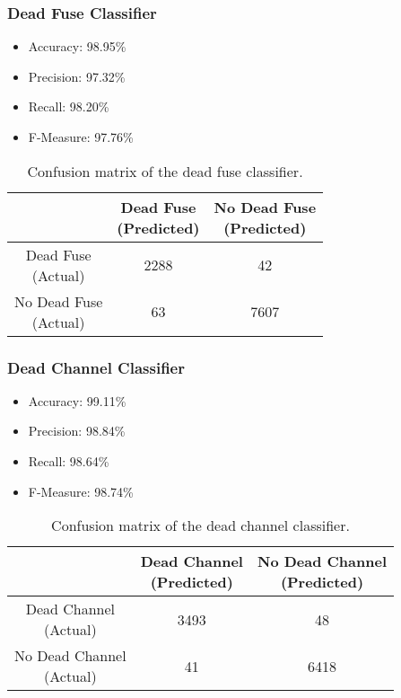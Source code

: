 \begin{frame}
  \frametitle{Dead Fuse Classifier}
  \begin{itemize}
  \item Accuracy: 98.95\%
  \item Precision: 97.32\%
  \item Recall: 98.20\%
  \item F-Measure: 97.76\%
\end{itemize}
\begin{table}[h]
  \centering
  \renewcommand\theadfont{\bfseries}
  \begin{tabular}{|c|c|c|}
    \hline
    & \thead{Dead Fuse\\(Predicted)} & \thead{No Dead Fuse\\(Predicted)} \\
    \hline
    \thead{Dead Fuse\\(Actual)} & 2288 & 42\\
    \hline
    \thead{No Dead Fuse\\(Actual)} & 63 & 7607\\
    \hline
  \end{tabular}
  \caption{Confusion matrix of the dead fuse classifier.}
\end{table}
\end{frame}

\begin{frame}
  \frametitle{Dead Channel Classifier}
  \begin{itemize}
  \item Accuracy: 99.11\%
  \item Precision: 98.84\%
  \item Recall: 98.64\%
  \item F-Measure: 98.74\%
\end{itemize}
\begin{table}[h]
  \centering
  \renewcommand\theadfont{\bfseries}
  \begin{tabular}{|c|c|c|}
    \hline
    & \thead{Dead Channel\\(Predicted)} & \thead{No Dead Channel\\(Predicted)} \\
    \hline
    \thead{Dead Channel\\(Actual)} & 3493 & 48\\
    \hline
    \thead{No Dead Channel\\(Actual)} & 41 & 6418\\
    \hline
  \end{tabular}
  \caption{Confusion matrix of the dead channel classifier.}
\end{table}
\end{frame}

